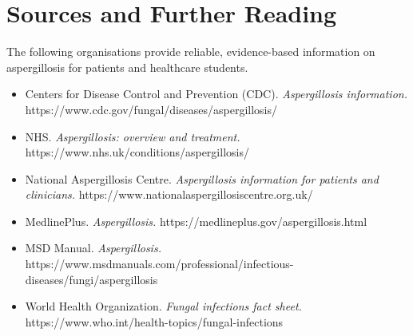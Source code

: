 \section*{Sources and Further Reading}
The following organisations provide reliable, evidence-based information on aspergillosis for patients and healthcare students.

\begin{itemize}
    \item Centers for Disease Control and Prevention (CDC). \textit{Aspergillosis information.} https://www.cdc.gov/fungal/diseases/aspergillosis/
    \item NHS. \textit{Aspergillosis: overview and treatment.} https://www.nhs.uk/conditions/aspergillosis/
    \item National Aspergillosis Centre. \textit{Aspergillosis information for patients and clinicians.} https://www.nationalaspergillosiscentre.org.uk/
    \item MedlinePlus. \textit{Aspergillosis.} https://medlineplus.gov/aspergillosis.html
    \item MSD Manual. \textit{Aspergillosis.} https://www.msdmanuals.com/professional/infectious-diseases/fungi/aspergillosis
    \item World Health Organization. \textit{Fungal infections fact sheet.} https://www.who.int/health-topics/fungal-infections
\end{itemize}
